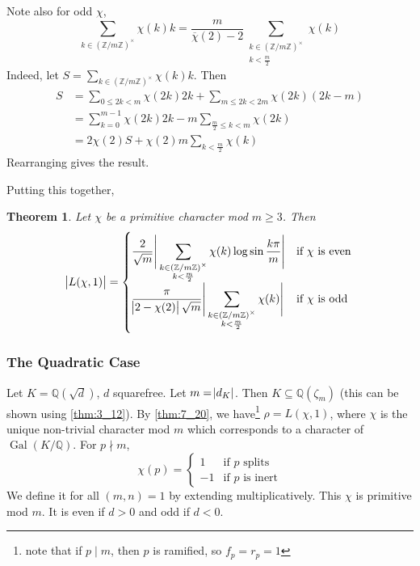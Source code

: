 \documentclass[11pt]{article}
\theoremstyle{definition}
\theoremstyle{plain}
\newtheorem{theorem}[definition]{Theorem}
\theoremstyle{remark}
\DeclareMathOperator{\Gal}{Gal}
\newcommand{\ZZ}{\mathbb{Z}}
\newcommand{\QQ}{\mathbb{Q}}
\begin{document}
\noindent Note also for odd $\chi$,
\begin{equation*}
    \sum_{k \in (\ZZ / m \ZZ)^\times} \chi(k) k = \frac{m}{\overline{\chi}(2) - 2} \sum_{\substack{k \in (\ZZ/m\ZZ)^\times \\ k < \frac{m}{2}}} \chi(k)
\end{equation*}
{\color{blue}
    Indeed, let $S = \sum_{k \in (\ZZ / m\ZZ)^\times} \chi(k) k$. Then
    \begin{align*}
        S
        &= \sum_{0 \le 2k < m} \chi(2k) 2k + \sum_{m \le 2k < 2m} \chi(2k) (2k-m)\\
        &= \sum_{k=0}^{m-1} \chi(2k) 2k - m \sum_{\frac{m}{2} \le k < m} \chi(2k)\\
        &= 2 \chi(2) S + \chi(2) m \sum_{k < \frac{m}{2}} \chi(k)
    \end{align*}
    Rearranging gives the result.
}

Putting this together,
\begin{theorem}\label{thm:7_26}
    Let $\chi$ be a primitive character mod $m \ge 3$. Then
    \begin{equation*}
        \abs{L(\chi, 1)} = \begin{cases}
            \displaystyle\frac{2}{\sqrt{m}} \Bigg\lvert\sum_{\substack{k \in (\ZZ/m\ZZ)^\times \\ k < \frac{m}{2}}} \chi(k) \log \sin \frac{k \pi}{m} \Bigg\rvert & \text{if } \chi \text{ is even} \\
            \displaystyle\frac{\pi}{\abs{2 - \chi(2)} \sqrt{m}} \Bigg\lvert\sum_{\substack{k \in (\ZZ/m\ZZ)^\times \\ k < \frac{m}{2}}} \chi(k)\Bigg\rvert & \text{if } \chi \text{ is odd}
        \end{cases}
    \end{equation*}
\end{theorem}

\subsubsection*{The Quadratic Case}
Let $K = \QQ(\sqrt{d})$, $d$ squarefree. Let $m = \abs{d_K}$. Then $K \subseteq \QQ(\zeta_m)$ (this can be shown using \autoref{thm:3_12}). By \autoref{thm:7_20}, we have\footnote{note that if $p \mid m$, then $p$ is ramified, so $f_p = r_p = 1$} $\rho = L(\chi, 1)$, where $\chi$ is the unique non-trivial character mod $m$ which corresponds to a character of $\Gal(K/\QQ)$. For $p \nmid m$,
\begin{equation*}
    \chi(p) = \begin{cases}
        1 & \text{if } p \text{ splits}\\
        -1 & \text{if } p \text{ is inert}
    \end{cases}
\end{equation*}
We define it for all $(m, n) = 1$ by extending multiplicatively. This $\chi$ is primitive mod $m$. It is even if $d > 0$ and odd if $d < 0$. %
\end{document}
